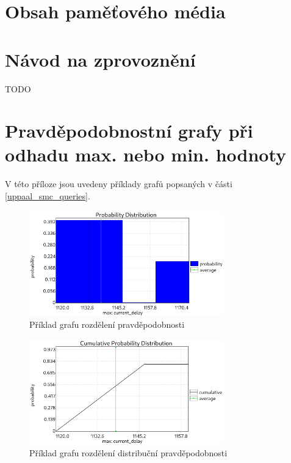 \chapter{Obsah paměťového média}

\chapter{Návod na zprovoznění}
TODO

\chapter{Pravděpodobnostní grafy při odhadu max. nebo min. hodnoty} \label{append:prob_plots}
V této příloze jsou uvedeny příklady grafů popsaných v části \ref{uppaal_smc_queries}.

\begin{figure}[H]
    \centering
    \includegraphics[width=0.75\textwidth]{obrazky-figures/plot_prob_dist.png}
    \caption{Příklad grafu rozdělení pravděpodobnosti}
    \label{fig:plot_prob_dist}
\end{figure}

\begin{figure}[H]
    \centering
    \includegraphics[width=0.75\textwidth]{obrazky-figures/plot_cum_prob_dist.png}
    \caption{Příklad grafu rozdělení distribuční pravděpodobnosti}
    \label{fig:plot_cum_prob_dist}
\end{figure}

